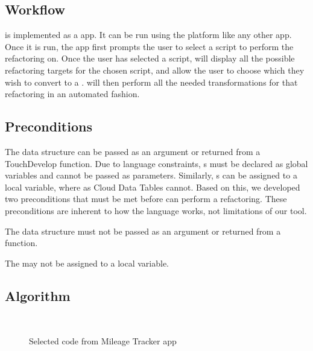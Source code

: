 \documentclass{sigplanconf}
\begin{document}
\subsection{Workflow}
\label{sec:workflow}
\tool is implemented as a \TD app.  It can be run using the \TD platform like any other \TD app.  Once it is run, the app first prompts the user to select a script to perform the refactoring on.  Once the user has selected a script, \tool will display all the possible refactoring targets for the chosen script, and allow the user to choose which \NC they wish to convert to a \CDT. \tool will then perform all the needed transformations for that refactoring in an automated fashion.  


\subsection{Preconditions}
\label{sec:preconditions}

The \NC{} data structure can be passed as an argument or returned from a TouchDevelop function.  Due to language constraints, \CDT{}s must be declared as global variables and cannot be passed as parameters.  Similarly, \NC{}s can be assigned to a local variable, where as Cloud Data Tables cannot.  Based on this, we developed two preconditions that must be met before \tool can perform a refactoring.  These preconditions are inherent to how the \TD language works, not limitations of our tool.  

\POne  The \NC{} data structure must not be passed as an argument or returned from a \TD function. 

\PTwo The \NC{} may not be assigned to a local variable.



\subsection{Algorithm}
\label{sec:algorithm}

\begin{figure}
   \centering
    \mbox{
      \subfigure[before]{
      
      \label{fig:aicOverload}
      }
      \hspace{0.2in}
      \subfigure[after]{
      
      \label{fig:lambdaOverload}
      }
    }
    \caption{Selected code from Mileage Tracker app}
    \label{fig:codeTransformations}
\end{figure}
\end{document}
